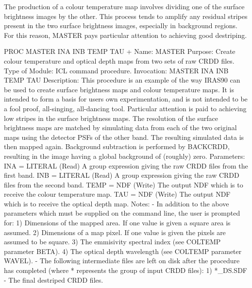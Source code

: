 \documentclass[11pt,nolof,noabs]{starlink}
\begin{document}
The production of a colour temperature map involves dividing one of
the surface brightness images by the other. This process tends to amplify any
residual stripes present in the two surface brightness images, especially in
background regions. For this reason, {\small MASTER} pays particular
attention to achieving good destriping.

\small
\begin{terminalv}
PROC MASTER INA INB TEMP TAU
{+
{  Name:
{     MASTER
{
{  Purpose:
{     Create colour temperature and optical depth maps from two sets
{     of raw CRDD files.
{
{  Type of Module:
{     ICL command procedure.
{
{  Invocation:
{     MASTER INA INB TEMP TAU
{
{  Description:
{     This procedure is an example of the way IRAS90 can be used to
{     create surface brightness maps and colour temperature maps.
{     It is intended to form a basis for users own experimentation,
{     and is not intended to be a fool proof, all-singing, all-dancing
{     tool.
{
{     Particular attention is paid to achieving low stripes in the
{     surface brightness maps. The resolution of the surface
{     brightness maps are matched by simulating data from each of the
{     two original maps using the detector PSFs of the other band. The
{     resulting simulated data is then mapped again. Background
{     subtraction is performed by BACKCRDD, resulting in the image
{     having a global background of (roughly) zero.
{
{  Parameters:
{     INA = LITERAL (Read)
{        A group expression giving the raw CRDD files from the first
{        band.
{     INB = LITERAL (Read)
{        A group expression giving the raw CRDD files from the second
{        band.
{     TEMP = NDF (Write)
{        The output NDF which is to receive the colour temperature
{        map.
{     TAU = NDF (Write)
{        The output NDF which is to receive the optical depth map.
{
{  Notes:
{     -  In addition to the above parameters which must be supplied
{     on the command line, the user is prompted for:
{
{        1)  Dimensions of the mapped area. If one value is given a
{        square area is assumed.
{
{        2)  Dimensions of a map pixel. If one value is given the
{        pixels are assumed to be square.
{
{        3) The emmisivity spectral index (see COLTEMP parameter
{        BETA).
{
{        4) The optical depth wavelength (see COLTEMP parameter
{        WAVEL).
{
{     -  The following intermediate files are left on disk after the
{     procedure has completed (where * represents the group of input
{     CRDD files):
{
{        1) *_DS.SDF - The final destriped CRDD files.
}}}}}}}}}}}}}}}}}}}}}}}}}}}}}}}}}}}}}}}}}}}}}}}}}}}}}}}}}}}}}}}
\end{terminalv}
\end{document}
